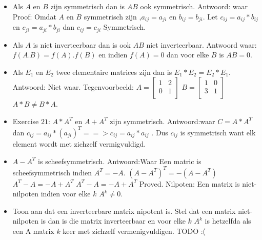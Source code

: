 \documentclass{article}
\begin{document}
\begin{itemize}
\item Als $A$ en $B$ zijn symmetrisch dan is $AB$ ook symmetrisch.\newline
Antwoord: waar
\newline
Proof:
Omdat $A$ en $B$ symmetrisch zijn ,$a_{ij} = a_{ji}$ en $b_{ij} = b_{ji}$.\newline
Let $c_{ij}  = a_{ij}*b_{ij}$ en $c_{ji} = a_{ji}*b_{ji}$ dan $c_{ij} = c_{ji}$ Symmetrisch.

\item Als $A$ is niet inverteerbaar dan is ook $AB$ niet inverteerbaar.
\newline
Antwoord waar:\newline
$f(A.B) = f(A).f(B)$ en indien $f(A) = 0$ dan voor elke $B$ is $AB = 0$.\newline
\item Als $E_1$ en $E_2$ twee elementaire matrices zijn dan is $E_1*E_2 = E_2*E_1$.
\newline
Antwoord: Niet waar.
Tegenvoorbeeld:
  $A = \begin{bmatrix}
  1 & 2\\
  0 & 1\\
  \end{bmatrix}
 $
$B = \begin{bmatrix}
1 & 0\\
3 & 1\\
\end{bmatrix}$
\newline
$A*B \neq B*A$.
\newline

\item Exercise $21$:\newline
$A*A^T$ en $A+ A^T$ zijn symmetrisch.
\newline
Antwoord:waar
\newline
$C = A*A^T$ dan $c_{ij} = a_{ij}*(a_{ji})^T  ==> c_{ij} = a_{ij}*a_{ij}$  .\newline
Dus $c_{ij}$ is symmetrisch want elk element wordt met zichzelf vermigvuldigd.
\newline
\item $A-A^T$ is scheefsymmetrisch.
Antwoord:Waar \newline
Een matric is scheefsymmetrisch indien $A^T = -A$.\newline
$(A-A^T)^T = -(A-A^T)$ \newline
$A^T - A = -A + A^T$\newline
$A^T - A =  -A + A^T$\newline
Proved.
\newline
Nilpoten: Een matrix is niet-nilpoten indien voor elke $k$ $A^k \neq 0$.\newline
\item Toon aan dat een inverteerbare matrix nipotent is.
\newline
Stel dat een matrix niet-nilpoten is dan is die matrix inverteerbaar en voor elke $k$ $A^k $ is hetzelfda als een A matrix $k$ keer met zichzelf vermenigvuldigen.\newline
TODO :(



\end{itemize}
\end{document}
